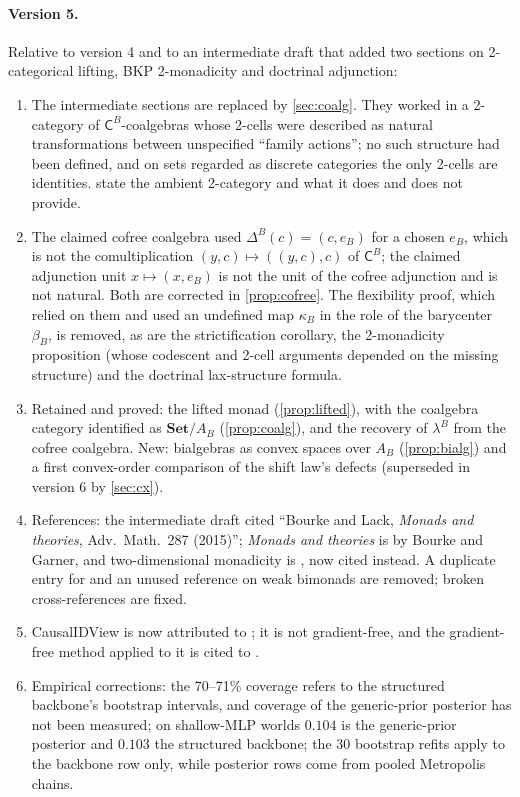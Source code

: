 \documentclass[11pt]{article}
\theoremstyle{definition}
\theoremstyle{remark}
\newcommand{\Set}{\mathbf{Set}}
\newcommand{\C}{\mathsf{C}}
\begin{document}
\paragraph{Version 5.} Relative to version 4 and to an intermediate draft that added two
sections on 2-categorical lifting, BKP 2-monadicity and doctrinal adjunction:
\begin{enumerate}[leftmargin=*,label=(\alph*)]
\item The intermediate sections are replaced by \cref{sec:coalg}. They worked in a 2-category of
  $\C^B$-coalgebras whose 2-cells were described as natural transformations between unspecified
  ``family actions''; no such structure had been defined, and on sets regarded as discrete categories
  the only 2-cells are identities.  state the ambient 2-category and what it
  does and does not provide.
\item The claimed cofree coalgebra used $\Delta^B(c)=(c,e_B)$ for a chosen $e_B$, which is not the
  comultiplication $(y,c)\mapsto((y,c),c)$ of $\C^B$; the claimed adjunction unit $x\mapsto(x,e_B)$ is
  not the unit of the cofree adjunction and is not natural. Both are corrected in
  \cref{prop:cofree}. The flexibility proof, which relied on them and used an undefined map $\kappa_B$
  in the role of the barycenter $\beta_B$, is removed, as are the strictification corollary, the
  2-monadicity proposition (whose codescent and 2-cell arguments depended on the missing structure)
  and the doctrinal lax-structure formula.
\item Retained and proved: the lifted monad (\cref{prop:lifted}), with the coalgebra category
  identified as $\Set/A_B$ (\cref{prop:coalg}), and the recovery of $\lambda^B$ from the cofree
  coalgebra. New: bialgebras as convex spaces over $A_B$ (\cref{prop:bialg}) and a first convex-order
  comparison of the shift law's defects (superseded in version 6 by \cref{sec:cx}).
\item References: the intermediate draft cited ``Bourke and Lack, \emph{Monads and theories}, Adv.\
  Math.\ 287 (2015)''; \emph{Monads and theories} is by Bourke and Garner, and two-dimensional
  monadicity is \cite{Bourke2014}, now cited instead. A duplicate entry for \cite{Street1972} and an
  unused reference on weak bimonads are removed; broken cross-references are fixed.
\item CausalIDView is now attributed to \cite{Jung2026}; it is not gradient-free, and the
  gradient-free method applied to it is cited to \cite[Section~51]{Awasthi-ThreeLayers}.
\item Empirical corrections: the 70--71\% coverage refers to the structured backbone's bootstrap
  intervals, and coverage of the generic-prior posterior has not been measured; on shallow-MLP worlds
  $0.104$ is the generic-prior posterior and $0.103$ the structured backbone; the 30 bootstrap refits
  apply to the backbone row only, while posterior rows come from pooled Metropolis chains.
\end{enumerate}
\end{document}
